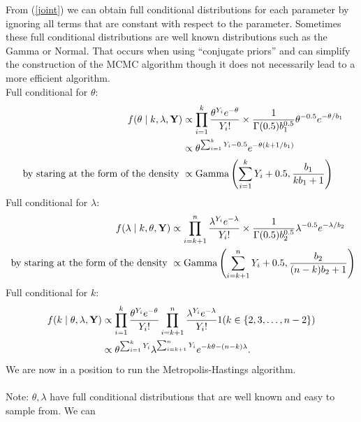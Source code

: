 \documentclass[11pt]{article}
\begin{document}
\noindent From (\ref{joint}) we can obtain full conditional distributions for
each parameter by ignoring all terms that are constant with respect to
the parameter. Sometimes these full conditional distributions are well
known distributions such as the Gamma or Normal. That occurs
 when using ``conjugate priors'' and can simplify the construction of the MCMC algorithm though it does not
necessarily lead to a more efficient algorithm. 
\\
Full conditional for $\theta$:
\begin{equation*}
\begin{split}
  f(\theta\mid k,\lambda ,{\bf Y}) & \propto \prod_{i=1}^k
  \frac{\theta^{Y_i} e^{-\theta}}{Y_i !} \times
  \frac{1}{\Gamma(0.5)b_1^{0.5}} \theta^{-0.5} e^{-\theta/b_1}\\
  & \propto \theta^{\sum_{i=1}^k Y_i-0.5} e^{-\theta(k+ 1/b_1)}  \\
  \mbox{ by staring at the form of the density } & \propto \mbox{Gamma}\left(\sum_{i=1}^k Y_i + 0.5, \frac{b_1}{k b_1+1}\right)
\end{split}
\end{equation*}
Full conditional for $\lambda$:
\begin{equation*}
\begin{split}
f(\lambda\mid k,\theta, {\bf Y}) & \propto \prod_{i=k+1}^n \frac{\lambda^{Y_i} e^{-\lambda}}{Y_i !} \times \frac{1}{\Gamma(0.5)b_2^{0.5}} \lambda^{-0.5} e^{-\lambda/b_2} \\
\mbox{ by staring at the form of the density } & \propto \mbox{Gamma}\left(\sum_{i=k+1}^n Y_i + 0.5, \frac{b_2}{(n-k) b_2+1}\right)
\end{split}
\end{equation*}
Full conditional for $k$:
\begin{equation*}
\begin{split}
f(k\mid\theta,\lambda, {\bf Y}) & \propto \prod_{i=1}^k
\frac{\theta^{Y_i} e^{-\theta}}{Y_i !} \prod_{i=k+1}^n
\frac{\lambda^{Y_i} e^{-\lambda}}{Y_i !} 1 (k\in \{2,3,\dots, n-2\})\\
& \propto \theta^{\sum_{i=1}^k Y_i} \lambda ^{\sum_{i=k+1}^n Y_i} e^{-k \theta - (n-k) \lambda}.
\end{split}
\end{equation*}
We are now in a position to run the Metropolis-Hastings algorithm.\\\\
Note: $\theta,\lambda $ have full conditional
distributions that are well known and easy to sample from. We can
\end{document}
